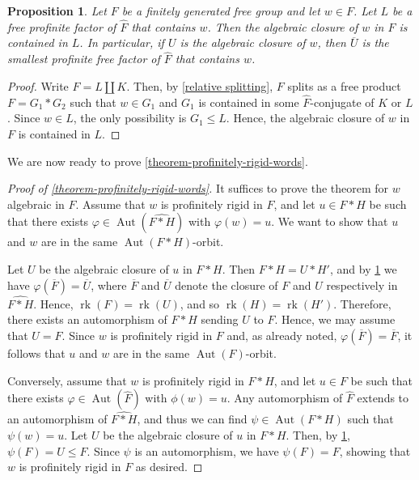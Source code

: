 \documentclass[a4paper]{amsart}
\newtheorem{pro}[lem]{Proposition}
\theoremstyle{definition}
\theoremstyle{remark}
\DeclareMathOperator{\Aut}{\mathrm{Aut}}
\begin{document}
\begin{pro}\label{algebraic} Let \(F\) be a finitely generated free group and let \(w \in F\).  Let \(L\) be a free profinite factor of \(\widehat{F}\) that contains \(w\). Then the algebraic closure of \(w\) in \(F\) is contained in \(L\). In particular, if \(U\) is the algebraic closure of \(w\), then \(\overline{U}\) is the smallest profinite free factor of \(\widehat{F}\) that contains \(w\).
\end{pro}

\begin{proof}
Write \(\widehat{F} = L \amalg K\). Then, by \cref{relative splitting}, \(F\) splits as a free product \(F = G_1 * G_2\) such that \(w \in G_1\) and \(G_1\) is contained in some \(\widehat{F}\)-conjugate of \(K\) or \(L\). Since \(w \in L\), the only possibility is \(G_1 \leq L\). Hence, the algebraic closure of \(w\) in \(F\) is contained in \(L\).
\end{proof}

We are now ready to prove \cref{theorem-profinitely-rigid-words}.

\begin{proof}[Proof of \cref{theorem-profinitely-rigid-words}] It suffices to prove the theorem for \(w\) algebraic in \(F\). Assume that \(w\) is profinitely rigid in \(F\), and let \(u \in F*H\) be such  that there exists \(\varphi \in \Aut(\widehat{F*H})\) with \(\varphi(w)= u\). We want to show that \(u\) and \(w\) are in the same \(\Aut(F*H)\)-orbit. 

Let \(U\) be the algebraic closure of \(u\) in \(F*H\). Then \(F*H = U* H'\), and by \cref{algebraic} we have \(\varphi(\overline{F}) = \overline{U}\), where \(\overline{F}\) and \(\overline{U}\) denote the closure of \(F\) and \(U\) respectively in \(\widehat{F*H}\). Hence, \(\operatorname{rk}(F) = \operatorname{rk}(U)\), and so \(\operatorname{rk}(H) = \operatorname{rk}(H')\). Therefore, there exists an automorphism of \(F *H\) sending \(U\) to \(F\). Hence, we may assume that \(U = F\). Since \(w\) is profinitely rigid in \(F\) and, as already noted, \(\varphi(\overline{F}) = \overline{F}\), it follows that \(u\) and \(w\) are in the same \(\Aut(F)\)-orbit.

Conversely, assume that \(w\) is profinitely rigid in \(F *H\), and let \(u \in F\) be such that there exists \(\varphi \in \Aut(\widehat{F})\) with \(\phi(w) = u\). Any automorphism of \(\widehat{F}\) extends to an automorphism of \(\widehat{F*H}\), and thus we can find \(\psi \in \Aut(F *H)\) such that \(\psi(w) = u\). Let \(U\) be the algebraic closure of \(u\) in \(F *H\). Then, by \cref{algebraic}, \(\psi(F) = U \leq F\). Since \(\psi\) is an automorphism, we have \(\psi(F) = F\), showing that \(w\) is profinitely rigid in \(F\) as desired.
\end{proof}
\end{document}
